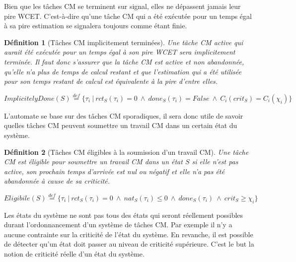 \documentclass[12pt,a4paper,oneside]{book}
\theoremstyle{break}
\newtheorem{defin}{Définition}[chapter]
\theoremstyle{breakplain}
\begin{document}
Bien que les tâches CM se terminent sur signal, elles ne dépassent jamais leur pire WCET. C'est-à-dire qu'une tâche CM qui a été exécutée pour un temps égal à sa pire estimation se signalera toujours comme étant finie.\\

\begin{defin}[Tâches CM implicitement terminées]
\label{spo:impdone}
Une tâche CM active qui aurait été exécutée pour un temps égal à son pire WCET sera implicitement terminée. Il faut donc s'assurer que la tâche CM est active et non abandonnée, qu'elle n'a plus de temps de calcul restant et que l'estimation qui a été utilisée pour son temps restant de calcul est équivalente à la pire d'entre elles.

\begin{center}
$ImplicitelyDone(S) \overset{def}{=} \{\tau_i\ |\ rct_S(\tau_i) = 0\ \wedge\ done_S(\tau_i) = False\ \wedge\ C_i(crit_S)=C_i(\chi_i)\}$\\
\end{center}
\end{defin}

L'automate se base sur des tâches CM sporadiques, il sera donc utile de savoir quelles tâches CM peuvent soumettre un travail CM dans un certain état du système.\\

\begin{defin}[Tâches CM éligibles à la soumission d'un travail CM]
\label{spo:eligible}
Une tâche CM est éligible pour soumettre un travail CM dans un état $S$ si elle n'est pas active, son prochain temps d'arrivée est nul ou négatif et elle n'a pas été abandonnée à cause de sa criticité.

\begin{center}
$Eligibile(S) \overset{def}{=} \{\tau_i\ |\ rct_S(\tau_i) = 0\ \wedge\ nat_S(\tau_i) \leq 0\ \wedge\ done_S(\tau_i)\ \wedge\ crit_S\geq\chi_i\}$\\
\end{center}
\end{defin}

Les états du système ne sont pas tous des états qui seront réellement possibles durant l’ordonnancement d’un système de tâches CM. Par exemple il n’y a aucune contrainte sur la criticité de l’état du système. En revanche, il est possible de détecter qu’un état doit passer au niveau de criticité supérieure. C’est le but la notion de criticité réelle d’un état du système.\\
\end{document}
